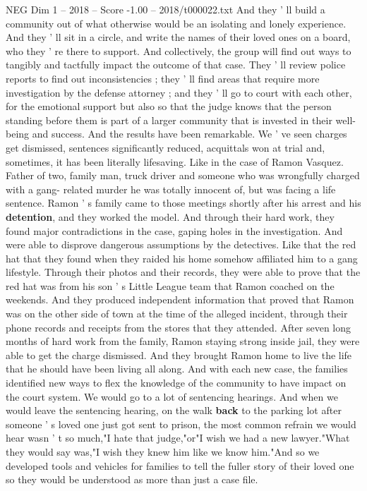 \begin{textsample}{NEG Dim 1 – 2018 – Score -1.00 – 2018/t000022.txt}
And they ' ll build a community out of what otherwise would be an isolating and lonely experience.
And they ' ll sit in a circle, and write the names of their loved ones on a board, who they ' re there to support.
And collectively, the group will find out ways to tangibly and tactfully impact the outcome of that case.
They ' ll review police reports to find out inconsistencies ; they ' ll find areas that require more investigation by the defense attorney ; and they ' ll go to court with each other, for the emotional support but also so that the judge knows that the person standing before them is part of a larger community that is invested in their well-being and success.
And the results have been remarkable.
We ' ve seen charges get dismissed, sentences significantly reduced, acquittals won at trial and, sometimes, it has been literally lifesaving.
Like in the case of Ramon Vasquez.
Father of two, family man, truck driver and someone who was wrongfully charged with a gang- related murder he was totally innocent of, but was facing a life sentence.
Ramon ' s family came to those meetings shortly after his arrest and his \textbf{detention}, and they worked the model.
And through their hard work, they found major contradictions in the case, gaping holes in the investigation.
And were able to disprove dangerous assumptions by the detectives.
Like that the red hat that they found when they raided his home somehow affiliated him to a gang lifestyle.
Through their photos and their records, they were able to prove that the red hat was from his son ' s Little League team that Ramon coached on the weekends.
And they produced independent information that proved that Ramon was on the other side of town at the time of the alleged incident, through their phone records and receipts from the stores that they attended.
After seven long months of hard work from the family, Ramon staying strong inside jail, they were able to get the charge dismissed.
And they brought Ramon home to live the life that he should have been living all along.
And with each new case, the families identified new ways to flex the knowledge of the community to have impact on the court system.
We would go to a lot of sentencing hearings.
And when we would leave the sentencing hearing, on the walk \textbf{back} to the parking lot after someone ' s loved one just got sent to prison, the most common refrain we would hear wasn ' t so much,"I hate that judge,"or"I wish we had a new lawyer."What they would say was,"I wish they knew him like we know him."And so we developed tools and vehicles for families to tell the fuller story of their loved one so they would be understood as more than just a case file.

\end{textsample}
